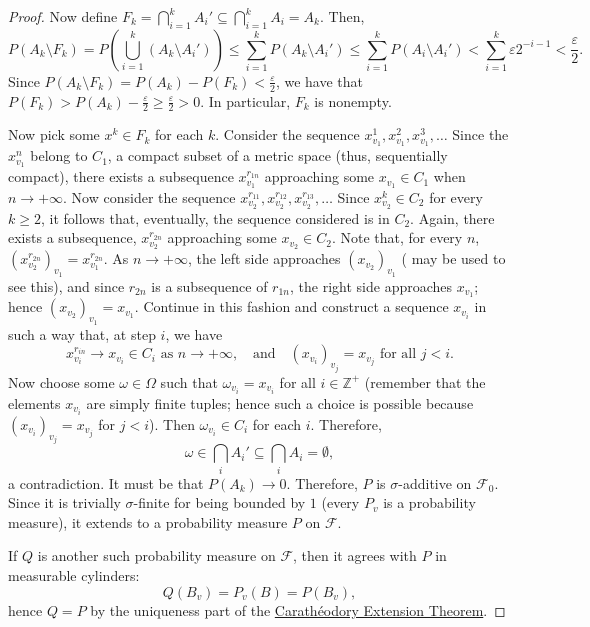\begin{proof}
Now define \(F_k=\bigcap_{i=1}^kA_i'\subseteq\bigcap_{i=1}^k A_i=A_k\). Then,
\[
		P(A_k\setminus F_k)=P\left(\bigcup_{i=1}^k(A_k\setminus A_i')\right)\leq\sum_{i=1}^{k}P\left(A_k\setminus A_i'\right)\leq\sum_{i=1}^{k} P(A_i\setminus A_i')<\sum_{i=1}^{k} \varepsilon 2^{-i-1}<\frac{\varepsilon}{2}
.\]
Since \(P(A_k\setminus F_k)=P(A_k)-P(F_k)<\frac{\varepsilon}{2}\), we have that \(P(F_k)>P(A_k)-\frac{\varepsilon}{2}\geq \frac{\varepsilon}{2}>0\). In particular, \(F_k\) is nonempty.

Now pick some \(x^k\in F_k\) for each \(k\). Consider the sequence \(x^1_{v_1},x^2_{v_1},x^3_{v_1},\dots\) Since the \(x^n_{v_1}\) belong to \(C_1\), a compact subset of a metric space (thus, sequentially compact), there exists a subsequence \(x_{v_1}^{r_{1n}}\) approaching some \(x_{v_1}\in C_1\) when \(n\to+\infty\). Now consider the sequence \(x_{v_2}^{r_{11}},x_{v_2}^{r_{12}},x_{v_2}^{r_{13}},\dots\) Since \(x^k_{v_2}\in C_2\) for every \(k\geq 2\), it follows that, eventually, the sequence considered is in \(C_2\). Again, there exists a subsequence, \(x_{v_2}^{r_{2n}}\) approaching some \(x_{v_2}\in C_2\). Note that, for every \(n\), \(\left(x_{v_2}^{r_{2n}}\right)_{v_1}=x_{v_1}^{r_{2n}}\). As \(n\to+\infty\), the left side approaches \(\left(x_{v_2}\right)_{v_1}\) ( may be used to see this), and since \(r_{2n}\) is a subsequence of \(r_{1n}\), the right side approaches \(x_{v_1}\); hence \(\left(x_{v_2}\right)_{v_1}=x_{v_1}\).
Continue in this fashion and construct a sequence \(x_{v_i}\) in such a way that, at step \(i\), we have
\[
		x_{v_i}^{r_{in}}\to x_{v_i}\in C_i \text{ as }n\to+\infty, ~~~\text{ and }~~~ \left(x_{v_i}\right)_{v_j}=x_{v_j} \text{ for all } j<i
.\]
Now choose some \(\omega\in\Omega\) such that \(\omega_{v_i}=x_{v_i}\) for all \(i\in\mathbb{Z}^{+}\) (remember that the elements \(x_{v_i}\) are simply finite tuples; hence such a choice is possible because \(\left(x_{v_i}\right)_{v_j}=x_{v_j}\) for \(j<i\)). Then \(\omega_{v_i}\in C_{i}\) for each \(i\). Therefore,
\[
		\omega\in\bigcap_{i}A_i'\subseteq\bigcap_{i}A_i=\emptyset
,\]
a contradiction. It must be that \(P(A_k)\to 0\). Therefore, \(P\) is \(\sigma\)-additive on \(\mathcal{F}_0\). Since it is trivially \(\sigma\)-finite for being bounded by \(1\) (every \(P_v\) is a probability measure), it extends to a probability measure \(P\) on \(\mathcal{F}\).

If \(Q\) is another such probability measure on \(\mathcal{F}\), then it agrees with \(P\) in measurable cylinders:
\[
		Q(B_v)=P_v(B)=P(B_v)
,\]
hence \(Q=P\) by the uniqueness part of the \hyperref[theorem:Caratheodory Extension]{Carathéodory Extension Theorem}.
\end{proof}
